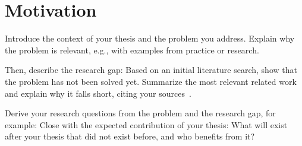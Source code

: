\section{Motivation}\label{sec:expose:motivation}


Introduce the context of your thesis and the problem you address.
Explain why the problem is relevant, e.g., with examples from practice or research.

Then, describe the research gap: Based on an initial literature search, show that the problem has not been solved yet.
Summarize the most relevant related work and explain why it falls short, citing your sources~\cite{Lichter2026}.

Derive your research questions from the problem and the research gap, for example:
%
%
%
Close with the expected contribution of your thesis:
What will exist after your thesis that did not exist before, and who benefits from it?
